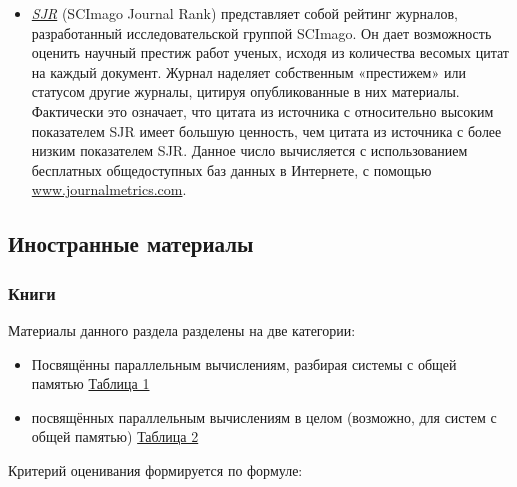\documentclass{article}
\begin{document}
\begin{itemize}
		\item \textit{\href{http://arxiv.org/abs/0912.4141}{SJR}} (SCImago Journal Rank) представляет собой рейтинг журналов, разработанный исследовательской группой SCImago. Он дает возможность оценить научный престиж работ ученых, исходя из количества весомых цитат на каждый документ. Журнал наделяет собственным «престижем» или статусом другие журналы, цитируя опубликованные в них материалы. Фактически это означает, что цитата из источника с относительно высоким показателем SJR имеет большую ценность, чем цитата из источника с более низким показателем SJR. Данное число вычисляется с использованием бесплатных общедоступных баз данных в Интернете, с помощью \href{http://www.journalmetrics.com/}{www.journalmetrics.com}.
	\end{itemize}
	
\newpage
	\subsection{Иностранные материалы}
		\subsubsection{Книги}
			Материалы данного раздела разделены на две категории:
			\begin{itemize}
				\item Посвящённы параллельным вычислениям, разбирая системы с общей памятью \hyperlink{table1}{Таблица 1}
				\item посвящённых параллельным вычислениям в целом (возможно, для систем с общей памятью) \hyperlink{table2}{Таблица 2}
			\end{itemize}
			Критерий оценивания формируется по формуле:
			
\end{document}
